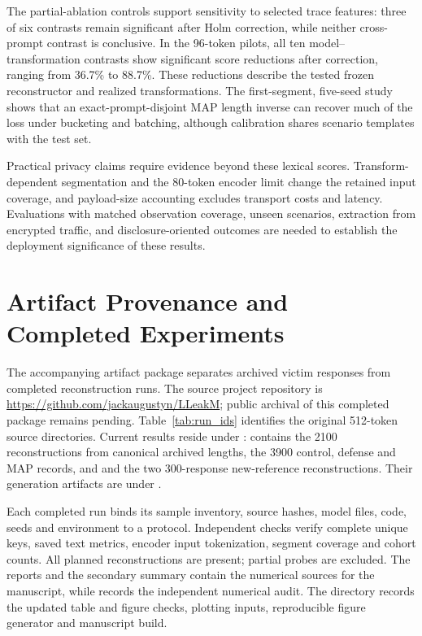 \documentclass[electronics,article,submit,pdftex,moreauthors]{Definitions/mdpi}
\begin{document}
The partial-ablation controls support sensitivity to selected trace features: three of six contrasts remain significant after Holm correction, while neither cross-prompt contrast is conclusive. In the 96-token pilots, all ten model--transformation contrasts show significant score reductions after correction, ranging from 36.7\% to 88.7\%. These reductions describe the tested frozen reconstructor and realized transformations. The first-segment, five-seed study shows that an exact-prompt-disjoint MAP length inverse can recover much of the loss under bucketing and batching, although calibration shares scenario templates with the test set.

Practical privacy claims require evidence beyond these lexical scores. Transform-dependent segmentation and the 80-token encoder limit change the retained input coverage, and payload-size accounting excludes transport costs and latency. Evaluations with matched observation coverage, unseen scenarios, extraction from encrypted traffic, and disclosure-oriented outcomes are needed to establish the deployment significance of these results.

\appendixstart
\appendix
\section{Artifact Provenance and Completed Experiments}\label{app:runs}
The accompanying artifact package separates archived victim responses from completed reconstruction runs. The source project repository is \url{https://github.com/jackaugustyn/LLeakM}; public archival of this completed package remains pending. Table~\ref{tab:run_ids} identifies the original 512-token source directories. Current results reside under :  contains the 2100 reconstructions from canonical archived lengths,  the 3900 control, defense and MAP records, and  and  the two 300-response new-reference reconstructions. Their generation artifacts are under .

Each completed run binds its sample inventory, source hashes, model files, code, seeds and environment to a protocol. Independent checks verify complete unique keys, saved text metrics, encoder input tokenization, segment coverage and cohort counts. All planned reconstructions are present; partial probes are excluded. The  reports and the secondary summary contain the numerical sources for the manuscript, while  records the independent numerical audit. The  directory records the updated table and figure checks, plotting inputs, reproducible figure generator and manuscript build.
\end{document}
